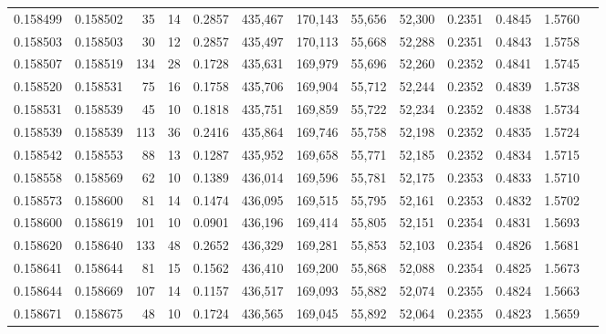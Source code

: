 \begin{tabular}{rrrrrrrrrrrrr}
0.158499 & 0.158502 &    35 &  14 &                                     0.2857 & 435,467 & 170,143 &  55,656 &  52,300 & 0.2351 & 0.4845 & 1.5760 \\
0.158503 & 0.158503 &    30 &  12 &                                     0.2857 & 435,497 & 170,113 &  55,668 &  52,288 & 0.2351 & 0.4843 & 1.5758 \\
0.158507 & 0.158519 &   134 &  28 &                                     0.1728 & 435,631 & 169,979 &  55,696 &  52,260 & 0.2352 & 0.4841 & 1.5745 \\
0.158520 & 0.158531 &    75 &  16 &                                     0.1758 & 435,706 & 169,904 &  55,712 &  52,244 & 0.2352 & 0.4839 & 1.5738 \\
0.158531 & 0.158539 &    45 &  10 &                                     0.1818 & 435,751 & 169,859 &  55,722 &  52,234 & 0.2352 & 0.4838 & 1.5734 \\
0.158539 & 0.158539 &   113 &  36 &                                     0.2416 & 435,864 & 169,746 &  55,758 &  52,198 & 0.2352 & 0.4835 & 1.5724 \\
0.158542 & 0.158553 &    88 &  13 &                                     0.1287 & 435,952 & 169,658 &  55,771 &  52,185 & 0.2352 & 0.4834 & 1.5715 \\
0.158558 & 0.158569 &    62 &  10 &                                     0.1389 & 436,014 & 169,596 &  55,781 &  52,175 & 0.2353 & 0.4833 & 1.5710 \\
0.158573 & 0.158600 &    81 &  14 &                                     0.1474 & 436,095 & 169,515 &  55,795 &  52,161 & 0.2353 & 0.4832 & 1.5702 \\
0.158600 & 0.158619 &   101 &  10 &                                     0.0901 & 436,196 & 169,414 &  55,805 &  52,151 & 0.2354 & 0.4831 & 1.5693 \\
0.158620 & 0.158640 &   133 &  48 &                                     0.2652 & 436,329 & 169,281 &  55,853 &  52,103 & 0.2354 & 0.4826 & 1.5681 \\
0.158641 & 0.158644 &    81 &  15 &                                     0.1562 & 436,410 & 169,200 &  55,868 &  52,088 & 0.2354 & 0.4825 & 1.5673 \\
0.158644 & 0.158669 &   107 &  14 &                                     0.1157 & 436,517 & 169,093 &  55,882 &  52,074 & 0.2355 & 0.4824 & 1.5663 \\
0.158671 & 0.158675 &    48 &  10 &                                     0.1724 & 436,565 & 169,045 &  55,892 &  52,064 & 0.2355 & 0.4823 & 1.5659 \\

\end{tabular}
